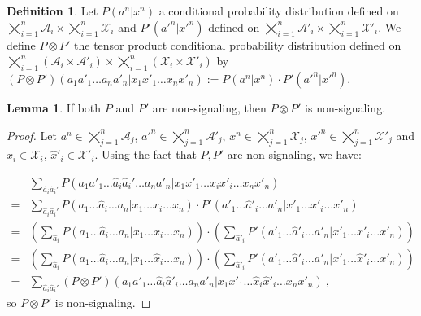 \documentclass[11pt]{article}
\theoremstyle{definition}
\newtheorem{lem}[theo]{Lemma}
\newtheorem{defi}[theo]{Definition}
\theoremstyle{remark}
\begin{document}
\begin{defi}
  Let $P(a^n|x^n)$ a conditional probability distribution defined on $\bigtimes_{i=1}^n\mathcal{A}_i \times \bigtimes_{i=1}^n \mathcal{X}_i$ and $P'(a'^n|x'^n)$ defined on $\bigtimes_{i=1}^n\mathcal{A}'_i \times \bigtimes_{i=1}^n \mathcal{X}'_i$. We define $P \otimes P'$ the tensor product conditional probability distribution defined on $\bigtimes_{i=1}^n(\mathcal{A}_i \times \mathcal{A}'_i) \times \bigtimes_{i=1}^n (\mathcal{X}_i \times \mathcal{X}'_i)$ by $\left(P \otimes P'\right)(a_1a'_1\ldots a_na'_n|x_1x'_1\ldots x_nx'_n) := P(a^n|x^n) \cdot P'(a'^n|x'^n)$.
\end{defi}

\begin{lem}
  \label{lem:NStensor}
  If both $P$ and $P'$ are non-signaling, then $P \otimes P'$ is non-signaling.
\end{lem}
\begin{proof}
  Let $a^n \in \bigtimes_{j=1}^n\mathcal{A}_j$, $a'^n \in \bigtimes_{j=1}^n\mathcal{A}'_j$, $x^n \in \bigtimes_{j=1}^n \mathcal{X}_j$, $x'^n \in \bigtimes_{j=1}^n \mathcal{X}'_j$ and $\hat{x}_i \in \mathcal{X}_i$, $\hat{x}'_i \in \mathcal{X}'_i$. Using the fact that $P,P'$ are non-signaling, we have:

  \begin{equation}
    \begin{aligned}
      &\sum_{\hat{a}_i\hat{a}_i'}P(a_1a'_1\ldots \hat{a}_i\hat{a}_i' \ldots a_na'_n|x_1x'_1\ldots x_ix'_i \ldots x_nx'_n)\\
      = &\sum_{\hat{a}_i\hat{a}_i'}  P(a_1\ldots \hat{a}_i \ldots a_n|x_1\ldots x_i \ldots x_n) \cdot P'(a'_1\ldots \hat{a}'_i \ldots a'_n|x'_1\ldots x'_i \ldots x'_n)\\
      = &\left(\sum_{\hat{a}_i}  P(a_1\ldots \hat{a}_i \ldots a_n|x_1\ldots x_i \ldots x_n)\right) \cdot \left(\sum_{\hat{a}'_i}  P'(a'_1\ldots \hat{a}'_i \ldots a'_n|x'_1\ldots x'_i \ldots x'_n)\right)\\
      = &\left(\sum_{\hat{a}_i}  P(a_1\ldots \hat{a}_i \ldots a_n|x_1\ldots \hat{x}_i \ldots x_n)\right) \cdot \left(\sum_{\hat{a}'_i}  P'(a'_1\ldots \hat{a}'_i \ldots a'_n|x'_1\ldots \hat{x}'_i \ldots x'_n)\right)\\
      = &\sum_{\hat{a}_i\hat{a}_i'}\left(P \otimes P'\right)(a_1a'_1\ldots \hat{a}_i\hat{a}'_i \ldots a_na'_n|x_1x'_1\ldots \hat{x}_i\hat{x}'_i \ldots x_nx'_n) \ ,
    \end{aligned}
  \end{equation}
  so $P \otimes P'$ is non-signaling.
\end{proof}
\end{document}
